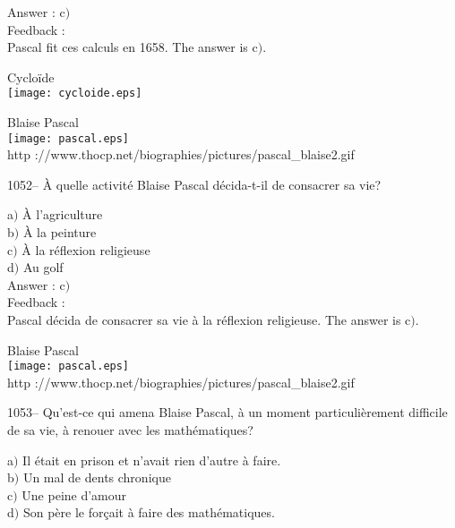 \documentclass[letterpaper, 12pt]{article}
\begin{document}
Answer : c$)$\\

Feedback : \\
Pascal fit ces calculs en 1658.
The answer is c$)$.\\

        \begin{center}

Cyclo\"ide\\
    \texttt{[image: cycloide.eps]}\\
    \end{center}

        \begin{center}
        Blaise Pascal\\
    \texttt{[image: pascal.eps]}\\
        {\footnotesize http
://www.thocp.net/biographies/pictures/pascal\_blaise2.gif}
    \end{center}

1052-- \`A quelle activit\'e Blaise Pascal d\'ecida-t-il de
consacrer sa vie?

a$)$ \`A l'agriculture \\
b$)$ \`A la peinture  \\
c$)$ \`A la r\'eflexion religieuse  \\
d$)$ Au golf\\

Answer : c$)$\\

Feedback : \\
Pascal d\'ecida de consacrer sa vie \`a la r\'eflexion religieuse.
The answer is c$)$.\\

        \begin{center}
        Blaise Pascal\\
    \texttt{[image: pascal.eps]}\\
        {\footnotesize http
://www.thocp.net/biographies/pictures/pascal\_blaise2.gif}
    \end{center}

1053-- Qu'est-ce qui amena Blaise Pascal, \`a un moment
particuli\`erement difficile de sa vie, \`a renouer avec les
math\'ematiques?

a$)$ Il \'etait en prison et n'avait rien d'autre \`a faire. \\
b$)$ Un mal de dents chronique  \\
c$)$ Une peine d'amour  \\
d$)$ Son p\`ere le for\c cait \`a faire des math\'ematiques.\\
\end{document}

